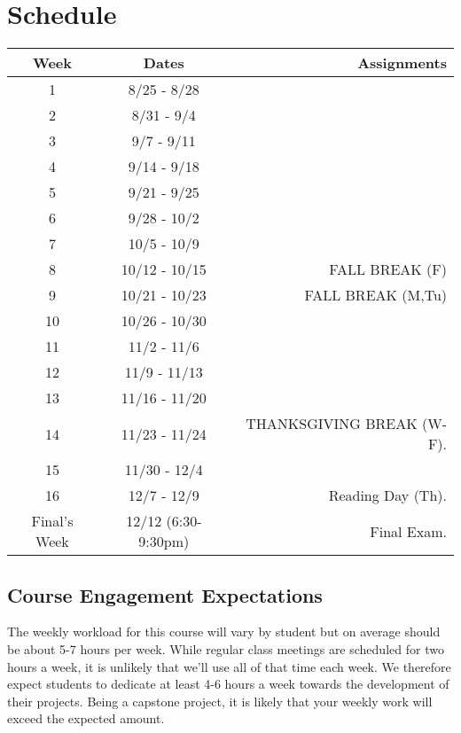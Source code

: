 \documentclass[10pt]{article}
\begin{document}
\section{Schedule}

\begin{center}
\begin{tabular}{|c|c|r|}
\hline 
Week & Dates & Assignments \\
\hline
1 & 8/25 - 8/28 &  \\
\hline 
2 & 8/31 - 9/4 &   \\
\hline
3 & 9/7 - 9/11 &   \\
\hline
4 & 9/14 - 9/18 &   \\
\hline
5 & 9/21 - 9/25 &  \\
\hline
6 & 9/28 - 10/2 & \\
\hline
7 & 10/5 - 10/9  &  \\
\hline 
8 & 10/12 - 10/15 &  FALL BREAK (F) \\
\hline
9 & 10/21 - 10/23 & FALL BREAK (M,Tu) \\
\hline
10 & 10/26 - 10/30 &  \\
\hline
11 & 11/2 - 11/6 & \\
\hline
12 & 11/9 - 11/13 &  \\
\hline
13 & 11/16 - 11/20 & \\
\hline
14 & 11/23 - 11/24 &  THANKSGIVING BREAK (W-F).   \\
\hline
15 & 11/30 - 12/4 & \\ 
\hline
16 & 12/7 - 12/9 &   Reading Day (Th). \\
\hline
Final's Week & 12/12 (6:30-9:30pm) & Final Exam. \\ 
\hline
\end{tabular}
\end{center}

\subsection{Course Engagement Expectations}

The weekly workload for this course will vary by student but on average should be about 5-7 hours per week.  While regular class meetings are scheduled for two hours a week, it is unlikely that we'll use all of that time each week.  We therefore expect students to dedicate at least 4-6 hours a week towards the development of their projects.  Being a capstone project, it is likely that your weekly work will exceed the expected amount.
\end{document}

